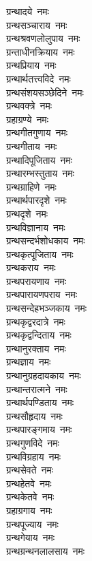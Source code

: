 \begin{multicols}{2}
\begin{flushleft}
ग्रन्थादये~नमः\\
ग्रन्थसञ्चाराय~नमः\hfill{}\\
ग्रन्थश्रवणलोलुपाय~नमः\\
ग्रन्ताधीनक्रियाय~नमः\\
ग्रन्थप्रियाय~नमः\\
ग्रन्थार्थतत्त्वविदे~नमः\\
ग्रन्थसंशयसञ्छेदिने~नमः\\
ग्रन्थवक्त्रे~नमः\\
ग्रहाग्रण्ये~नमः\\
ग्रन्थगीतगुणाय~नमः\\
ग्रन्थगीताय~नमः\\
ग्रन्थादिपूजिताय~नमः\hfill{}\\
ग्रन्थारम्भस्तुताय~नमः\\
ग्रन्थग्राहिणे~नमः\\
ग्रन्थार्थपारदृशे~नमः\\
ग्रन्थदृशे~नमः\\
ग्रन्थविज्ञानाय~नमः\\
ग्रन्थसन्दर्भशोधकाय~नमः\\
ग्रन्थकृत्पूजिताय~नमः\\
ग्रन्थकराय~नमः\\
ग्रन्थपरायणाय~नमः\\
ग्रन्थपारायणपराय~नमः\hfill{}\\
ग्रन्थसन्देहभञ्जकाय~नमः\\
ग्रन्थकृद्वरदात्रे~नमः\\
ग्रन्थकृद्वन्दिताय~नमः\\
ग्रन्थानुरक्ताय~नमः\\
ग्रन्थज्ञाय~नमः\\
ग्रन्थानुग्रहदायकाय~नमः\\
ग्रन्थान्तरात्मने~नमः\\
ग्रन्थार्थपण्डिताय~नमः\\
ग्रन्थसौहृदाय~नमः\\
ग्रन्थपारङ्गमाय~नमः\hfill{}\\
ग्रन्थगुणविदे~नमः\\
ग्रन्थविग्रहाय~नमः\\
ग्रन्थसेवते~नमः\\
ग्रन्थहेतवे~नमः\\
ग्रन्थकेतवे~नमः\\
ग्रहाग्रगाय~नमः\\
ग्रन्थपूज्याय~नमः\\
ग्रन्थगेयाय~नमः\\
ग्रन्थग्रन्थनलालसाय~नमः\\

\end{flushleft}
\end{multicols}
